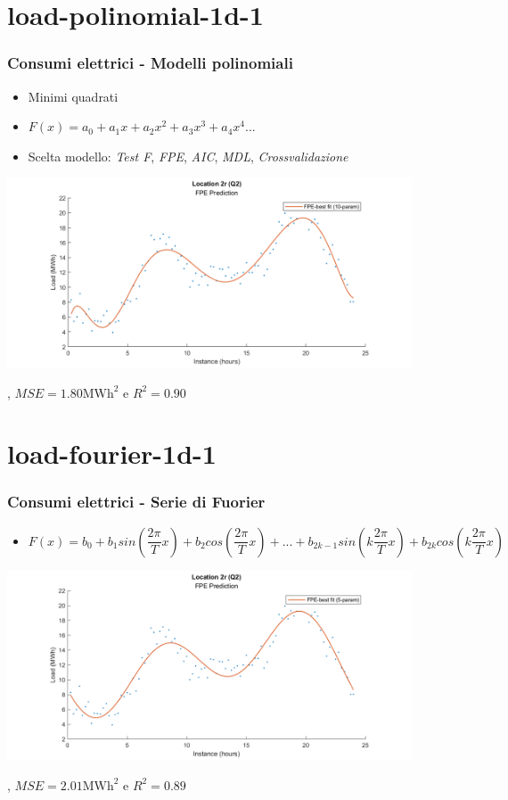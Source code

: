 \documentclass{beamer}
\begin{document}
\section{load-polinomial-1d-1}
\begin{frame}
    \frametitle{Consumi elettrici - Modelli polinomiali}
    \vfill    
    \begin{itemize}
        \item Minimi quadrati
        \item $F(x)=a_0+a_1x+a_2x^2+a_3x^3+a_4x^4...$        
        \item Scelta modello: 
            \textit{Test F}, 
            \textit{FPE}, 
            \textit{AIC}, 
            \textit{MDL}, 
            \textit{Crossvalidazione}
    \end{itemize}
    \vfill
    \centering
    \includegraphics[width=0.9\textwidth,keepaspectratio]{2_r_q2_FPE_poli.png} 
    
    \scriptsize  {}, $MSE=1.80\text{MWh}^2$ e $R^2=0.90$
\end{frame}

\section{load-fourier-1d-1}
\begin{frame}
    \frametitle{Consumi elettrici - Serie di Fuorier}  
    \begin{itemize}
        \item $F(x)=b_0+
	b_1sin\left(\dfrac{2\pi}{T}x\right)+b_2cos\left(\dfrac{2\pi}{T}x\right)+...+
	b_{2k-1}sin\left(k\dfrac{2\pi}{T}x\right)+b_{2k}cos\left(k\dfrac{2\pi}{T}x\right)$    
 
    \end{itemize}
    \vfill
    \centering
    \includegraphics[width=0.9\textwidth,keepaspectratio]{2_r_q2_FPE_fourier.png} 
    
    \scriptsize  {}, $MSE=2.01\text{MWh}^2$ e $R^2=0.89$
\end{frame}
\end{document}
